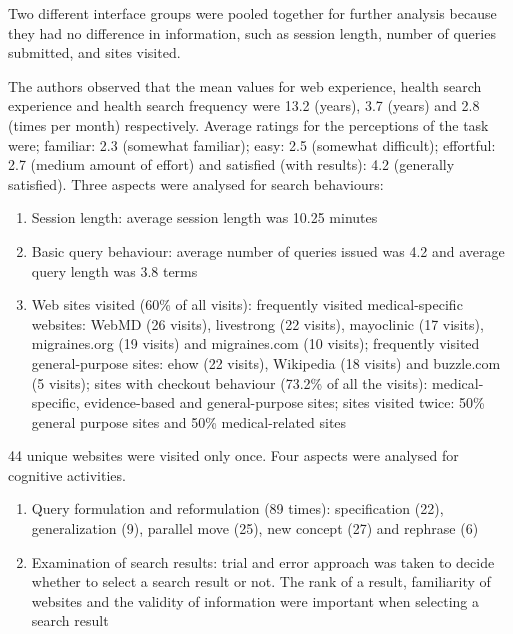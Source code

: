 \documentclass[]{article}
\begin{document}
\begin{enumerate}
Two different interface groups were pooled together for further analysis because they had no difference in information, such as session length, number of queries submitted, and sites visited.                       

The authors observed that the mean values for web experience, health search experience and health search frequency were 13.2 (years), 3.7 (years) and 2.8 (times per month) respectively. Average ratings for the perceptions of the task were; familiar: 2.3 (somewhat familiar); easy: 2.5 (somewhat difficult); effortful: 2.7 (medium amount of effort) and satisfied (with results): 4.2 (generally satisfied). Three aspects were analysed for search behaviours:

\begin{enumerate}
	\item Session length: average session length was 10.25 minutes
	
	\item Basic query behaviour: average number of queries issued was 4.2 and average query length was 3.8 terms
	
	\item Web sites visited (60\% of all visits): frequently visited medical-specific websites: WebMD (26 visits), livestrong (22 visits), mayoclinic (17 visits), migraines.org (19 visits) and migraines.com (10 visits); frequently visited general-purpose sites:  ehow (22 visits), Wikipedia (18 visits) and buzzle.com (5 visits); sites with checkout behaviour (73.2\% of all the visits): medical-specific, evidence-based and general-purpose sites; sites visited twice: 50\% general purpose sites and 50\% medical-related sites  
	
\end{enumerate}	 

44 unique websites were visited only once. Four aspects were analysed for cognitive activities. 

\begin{enumerate}
		\item Query formulation and reformulation (89 times): specification (22), generalization (9), parallel move (25), new concept (27) and rephrase (6)
		
		\item Examination of search results: trial and error approach was taken to decide whether to select a search result or not. The rank of a result, familiarity of websites and the validity of information were important when selecting a search result
		

\end{enumerate}
\end{enumerate}
\end{document}
